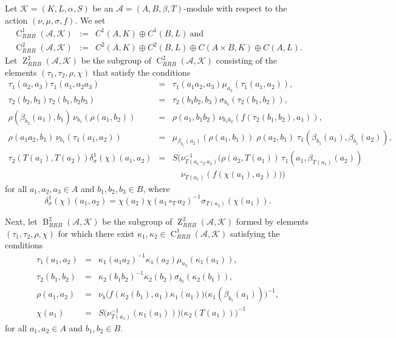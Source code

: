 \documentclass{jonasart}
\theoremstyle{plain}
\DeclareMathOperator{\B}{B}
\DeclareMathOperator{\C}{C}
\DeclareMathOperator{\Z}{Z}
\begin{document}
	Let $\mathcal{K} = (K, L, \alpha, S)$ be an $\mathcal{A} = (A, B, \beta, T)$-module with respect to the action $(\nu, \mu, \sigma, f)$. We set
	\begin{eqnarray*}
		\C^{1}_{RRB}(\mathcal{A}, \mathcal{K}) &:=& C^1 (A, K) \oplus C^1 (B,L)~\textrm{and}\\
		\C^{2}_{RRB}(\mathcal{A}, \mathcal{K}) &:=& C^2 (A, K) \oplus C^2 (B,L) \oplus C(A \times B, K) \oplus C(A,L).
	\end{eqnarray*}
	Let $\Z^2_{RRB}(\mathcal{A}, \mathcal{K})$ be the subgroup of $\C^{2}_{RRB}(\mathcal{A}, \mathcal{K})$ consisting of the elements $(\tau_1, \tau_2, \rho, \chi)$ that satisfy the conditions
	\begin{eqnarray}
		\tau_1 (a_2, a_3 ) \tau_1 ( a_1, a_2 a_3 ) &=& \tau_1 (a_1 a_2, a_3 ) \mu_{a_3}(\tau_1 (a_1, a_2 )),\label{cocycle1}\\
		\tau_2 (b_2, b_3 ) \tau_2 ( b_1, b_2 b_3 ) &=& \tau_2 (b_1 b_2, b_3 ) \sigma_{b_3}(\tau_2 (b_1, b_2 )),\label{cocycle2}\\
		\rho(\beta_{b_2}(a_1 ), b_1 ) \,\nu_{b_1}(\rho(a_1,b_2 )) &=& \rho(a_1, b_1 b_2 ) \, \nu_{b_1 b_2}( f(\tau_2 (b_1, b_2 ), a_1 )),\label{cocycle3}\\
		\rho(a_1 a_2, b_1 ) \, \nu_{b_1}(\tau_1 (a_1, a_2 )) &=& \mu_{ \beta_{b_1}(a_2 )}(\rho(a_1,b_1 ))\; \rho(a_2, b_1 ) \; \tau_1 (\beta_{b_1}(a_1 ), \beta_{b_1}(a_2 )), \\ \nonumber
		\tau_2 (T(a_1 ), T(a_2 ) ) \delta^1_{\sigma}(\chi)(a_1, a_2 ) &= & S \big(\nu^{-1}_{T(a_1 \circ_T a_2 )}\big(\rho(a_2, T(a_1 )) \, \tau_1 (a_1,\beta_{T(a_1 )}(a_2 )) \nonumber \\
		&& \quad \nu_{T(a_1 )}(f(\chi(a_1 ), a_2 )) \big)\big)\label{cocycle5}
	\end{eqnarray}
	for all $a_1, a_2, a_3 \in A$ and $b_1, b_2, b_3 \in B$, where
	\[
	\delta^1_{\sigma}(\chi)(a_1, a_2)= \chi(a_2) \chi(a_1 \circ_T a_2)^{-1} \sigma_{T(a_2)}(\chi(a_1)).
	\]
	
	Next, let $\B^2_{RRB}(\mathcal{A}, \mathcal{K})$ be the subgroup of $\Z^2_{RRB}(\mathcal{A}, \mathcal{K})$ formed by elements $(\tau_1, \tau_2, \rho, \chi)$ for which there exist $\kappa_1, \kappa_2 \in \C^{1}_{RRB}(\mathcal{A}, \mathcal{K})$ satisfying the conditions
	\begin{eqnarray*}
		\tau_1 (a_1, a_2 ) &=&\kappa_1 (a_1 a_2 )^{-1}\kappa_1 (a_2 ) \mu_{a_2} (\kappa_1 (a_1 )),\\
		\tau_2 (b_1, b_2 ) &=& \kappa_2 (b_1 b_2 )^{-1} \kappa_2 (b_2 ) \sigma_{b_2} (\kappa_2 (b_1 )),\\
		\rho(a_1, a_2 ) &=&\nu_b\big( f(\kappa_2 (b_1 ), a_1 )\kappa_1 (a_1 ) \big) \big(\kappa_1 (\beta_{b_1}(a_1 ))\big)^{-1},\\
		\chi(a_1 ) &=& S \big(\nu^{-1}_{T(a_1 )}(\kappa_1 (a_1 )) \big) \big( \kappa_2 (T(a_1 )) \big)^{-1}
	\end{eqnarray*}
	for all $a_1, a_2 \in A$ and $b_1, b_2 \in B$.
	
\end{document}
